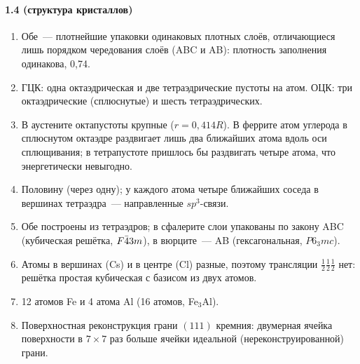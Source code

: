 {\paragraph{1.4 (структура кристаллов)}
\begin{enumerate}[label=\arabic*.]
\item Обе~— плотнейшие упаковки одинаковых плотных слоёв, отличающиеся
лишь порядком чередования слоёв (ABC и AB): плотность заполнения
одинакова, 0,74.
\item ГЦК: одна октаэдрическая и две тетраэдрические пустоты на атом.
ОЦК: три октаэдрические (сплюснутые) и шесть тетраэдрических.
\item В аустените октапустоты крупные ($r=0{,}414R$). В феррите атом
углерода в сплюснутом октаэдре раздвигает лишь два ближайших атома вдоль
оси сплющивания; в тетрапустоте пришлось бы раздвигать четыре атома, что
энергетически невыгодно.
\item Половину (через одну); у каждого атома четыре ближайших соседа в
вершинах тетраэдра~— направленные $sp^3$-связи.
\item Обе построены из тетраэдров; в сфалерите слои упакованы по закону
ABC (кубическая решётка, $F\bar{4}3m$), в вюрците~— AB (гексагональная,
$P6_3mc$).
\item Атомы в вершинах (Cs) и в центре (Cl) разные, поэтому трансляции
$\frac12\frac12\frac12$ нет: решётка простая кубическая с базисом из двух
атомов.
\item 12 атомов Fe и 4 атома Al (16 атомов, Fe$_3$Al).
\item Поверхностная реконструкция грани $(111)$ кремния: двумерная ячейка
поверхности в $7\times7$ раз больше ячейки идеальной (нереконструированной)
грани.
\end{enumerate}

}
